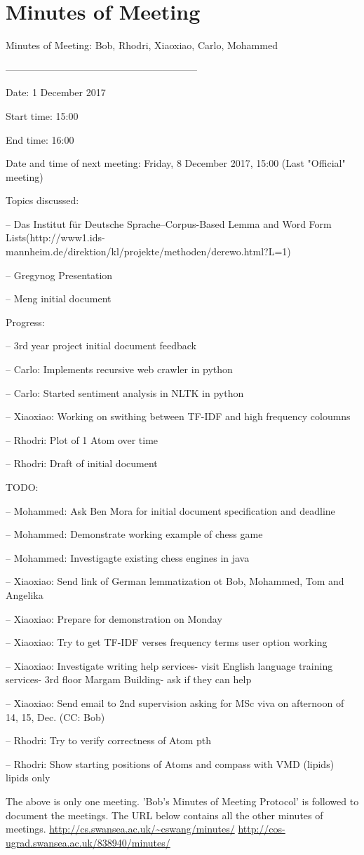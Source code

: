 \section{Minutes of Meeting }

Minutes of Meeting: Bob, Rhodri, Xiaoxiao, Carlo, Mohammed

-----------------------------------------------------------

Date:       1 December 2017

Start time: 15:00

End time:   16:00

Date and time of next meeting: Friday, 8 December 2017, 15:00 (Last "Official" meeting)

Topics discussed: 

-- Das Institut für Deutsche Sprache--Corpus-Based Lemma and Word Form Lists(http://www1.ids-mannheim.de/direktion/kl/projekte/methoden/derewo.html?L=1)

-- Gregynog Presentation

-- Meng initial document

Progress:

--  3rd year project initial document feedback

--  Carlo: Implements recursive web crawler in python

--  Carlo: Started sentiment analysis in NLTK in python

--  Xiaoxiao: Working on swithing between TF-IDF and high frequency coloumns

--  Rhodri: Plot of 1 Atom over time

--  Rhodri: Draft of initial document

TODO:

--  Mohammed: Ask Ben Mora for initial document specification and deadline

--  Mohammed: Demonstrate working example of chess game

--  Mohammed: Investigagte existing chess engines in java

--  Xiaoxiao: Send link of German lemmatization ot Bob, Mohammed, Tom and Angelika

--  Xiaoxiao: Prepare for demonstration on Monday

--  Xiaoxiao: Try to get TF-IDF verses frequency terms user option working

--  Xiaoxiao: Investigate writing help services- visit English language training services- 3rd floor Margam Building- ask if they can help

--  Xiaoxiao: Send email to 2nd supervision asking for MSc viva on afternoon of 14, 15, Dec. (CC: Bob)

--  Rhodri: Try to verify correctness of Atom pth

--  Rhodri: Show starting positions of Atoms and compass with VMD (lipids) lipids only

The above is only one meeting. 'Bob's Minutes of Meeting Protocol' \cite{Laramee2010} is followed to document the meetings. The URL below contains all the other minutes of meetings.
\url{http://cs.swansea.ac.uk/~cswang/minutes/}
\url{http://cos-ugrad.swansea.ac.uk/838940/minutes/}